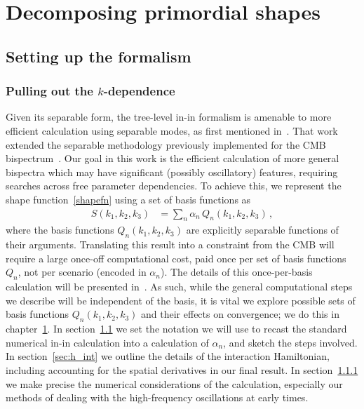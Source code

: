 %
\chapter{Decomposing primordial shapes}\label{chapter:decomp}
\section{Setting up the formalism}\label{sec:setting_notation}
    \subsection{Pulling out the $k$-dependence}\label{sec:k_dep}
    Given its separable form, the tree-level in-in formalism is amenable
to more efficient calculation using separable modes, as first mentioned in~\cite{Funakoshi}.
That work extended the separable methodology previously implemented for the CMB bispectrum~\cite{FergShell_3}.
Our goal in this work is the efficient calculation of more general bispectra
which may have significant (possibly oscillatory) features, requiring searches across free parameter dependencies.
To achieve this, we represent the shape function~\eqref{shapefn} using a set of basis functions as
\begin{align}\label{goal}
S(k_1, k_2,k_3) &= \sum_n \alpha_n  \, Q_n(k_1,k_2,k_3)\,,
\end{align}
where the basis functions $Q_n(k_1,k_2,k_3)$ are explicitly separable functions of their arguments.
Translating this result into a constraint from the CMB
will require a large once-off computational cost, paid once
per set of basis functions $Q_n$,
not per scenario (encoded in $\alpha_n$).
The details of this once-per-basis calculation will be
presented in~\cite{Sohn_2021}.
As such, while the general computational steps we
describe will be independent of the basis, it is vital we
explore possible sets of basis functions $Q_n(k_1,k_2,k_3)$
and their effects on convergence;
we do this in chapter~\ref{chapter:decomp}.
In section~\ref{sec:setting_notation} we set the notation we will use to recast
the standard numerical in-in calculation into a calculation of $\alpha_n$,
and sketch the steps involved.
In section~\ref{sec:h_int} we outline the details of the interaction Hamiltonian,
including accounting for the spatial derivatives in our final result.
In section~\ref{sec:k_dep} we make precise the numerical considerations
of the calculation,
especially our methods of dealing with the high-frequency
oscillations at early times.

